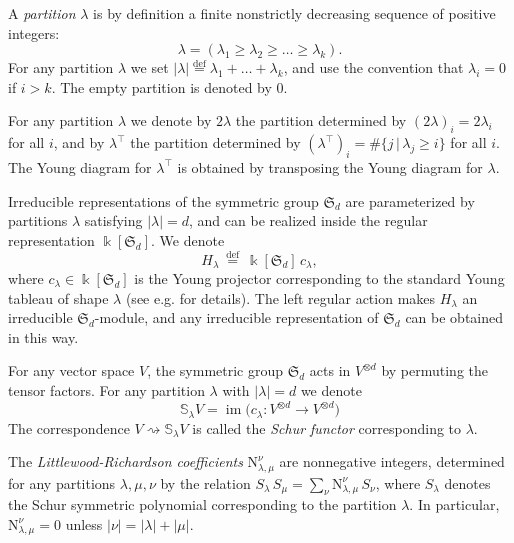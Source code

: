 \documentclass[12pt,reqno]{amsart}
\numberwithin{equation}{section}
\theoremstyle{plain}
\theoremstyle{definition}
\def\bydef{\overset{\mathrm {def}}=}
\def\LR{\mathrm N}
\def\im{\operatorname{im}}
\def\o{\otimes}
\begin{document}
\medskip

A \textit{partition} $\lambda$ is by definition a finite nonstrictly
decreasing sequence of positive integers:
\begin{equation*}
    \lambda = (\lambda_1 \ge \lambda_2 \ge \dots \ge \lambda_k).
\end{equation*}
For any partition $\lambda$ we set $|\lambda| \bydef \lambda_1 +
\dots + \lambda_k$, and use the convention that $\lambda_i=0$ if
$i>k$. The empty partition is denoted by $0$.

For any partition $\lambda$ we denote by $2\lambda$ the partition
determined by $(2\lambda)_i = 2\lambda_i$ for all $i$, and by
$\lambda^\top$ the partition determined by $(\lambda^\top)_i = \#
\{j \,|\, \lambda_j \ge i\}$ for all $i$. The Young diagram for
$\lambda^\top$ is obtained by transposing the Young diagram for
$\lambda$.



\medskip

Irreducible representations of the symmetric group $\mathfrak S_d$
are parameterized by partitions $\lambda$ satisfying $|\lambda| =
d$, and can be realized inside the regular representation
$\Bbbk[\mathfrak S_d]$. We denote
\begin{equation*}
    H_{\lambda} \ \bydef \ \Bbbk[\mathfrak S_d] \, c_\lambda,
\end{equation*}
where $c_\lambda \in \Bbbk[\mathfrak S_d]$ is the Young projector
corresponding to the standard Young tableau of shape $\lambda$ (see
e.g. \cite{FH} for details). The left regular action makes
$H_\lambda$ an irreducible $\mathfrak S_d$-module, and any
irreducible representation of $\mathfrak S_d$ can be obtained in
this way.

\medskip

For any vector space $V$, the symmetric group $\mathfrak S_d$ acts
in $V^{\o d}$ by permuting the tensor factors. For
any partition $\lambda$ with $|\lambda| = d$ we denote
\begin{equation*}
    \mathbb S_\lambda V = \im \biggr(c_\lambda: V^{\o d} \to V^{\o d} \biggr)
\end{equation*}
The correspondence $V \rightsquigarrow \mathbb S_\lambda V$ is
called the {\it Schur functor} corresponding to $\lambda$.

\medskip

The \textit{Littlewood-Richardson coefficients}
$\LR_{\lambda,\mu}^\nu$ are nonnegative integers, determined for any
partitions $\lambda,\mu,\nu$ by the relation $S_\lambda \, S_\mu =
\sum_\nu \LR_{\lambda,\mu}^\nu \, S_\nu$, where $S_\lambda$ denotes
the Schur symmetric polynomial corresponding to the partition
$\lambda$. In particular, $\LR_{\lambda,\mu}^\nu=0$ unless $|\nu| =
|\lambda|+|\mu|$.
\end{document}
